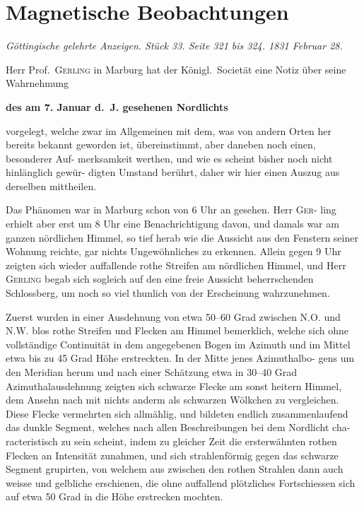 \documentclass[12pt,a4paper]{article}
\begin{document}
\newpage
\section*{Magnetische Beobachtungen}

\textit{Göttingische gelehrte Anzeigen. Stück 33. Seite 321 bis 324. 1831 Februar 28.}

Herr Prof.\ \textsc{Gerling} in Marburg hat der Königl.\ Societät eine Notiz über 
seine Wahrnehmung
\begin{center}
\textbf{des am 7. Januar d.\ J. gesehenen Nordlichts}
\end{center}
vorgelegt, welche zwar im Allgemeinen mit dem, was von andern Orten her bereits 
bekannt geworden ist, übereinstimmt, aber daneben noch einen, besonderer Auf-
merksamkeit werthen, und wie es scheint bisher noch nicht hinlänglich gewür-
digten Umstand berührt, daher wir hier einen Auszug aus derselben mittheilen.

Das Phänomen war in Marburg schon von 6 Uhr an gesehen. Herr \textsc{Ger}-
ling erhielt aber erst um 8 Uhr eine Benachrichtigung davon, und damals war 
am ganzen nördlichen Himmel, so tief herab wie die Aussicht aus den Fenstern 
seiner Wohnung reichte, gar nichts Ungewöhnliches zu erkennen. Allein gegen 
9 Uhr zeigten sich wieder auffallende rothe Streifen am nördlichen Himmel, und 
Herr \textsc{Gerling} begab sich sogleich auf den eine freie Aussicht beherrschenden 
Schlossberg, um noch so viel thunlich von der Erscheinung wahrzunehmen.

Zuerst wurden in einer Ausdehnung von etwa 50--60 Grad zwischen N.O. 
und N.W. blos rothe Streifen und Flecken am Himmel bemerklich, welche sich 
ohne vollständige Continuität in dem angegebenen Bogen im Azimuth und im 
Mittel etwa bis zu 45 Grad Höhe erstreckten. In der Mitte jenes Azimuthalbo-
gens um den Meridian herum und nach einer Schätzung etwa in 30--40 Grad 
Azimuthalausdehnung zeigten sich schwarze Flecke am sonst heitern Himmel, 
dem Ansehn nach mit nichts anderm als schwarzen Wölkchen zu vergleichen. 
Diese Flecke vermehrten sich allmählig, und bildeten endlich zusammenlaufend 
das dunkle Segment, welches nach allen Beschreibungen bei dem Nordlicht cha-
racteristisch zu sein scheint, indem zu gleicher Zeit die ersterwähnten rothen 
Flecken an Intensität zunahmen, und sich strahlenförmig gegen das schwarze 
Segment grupirten, von welchem aus zwischen den rothen Strahlen dann auch 
weisse und gelbliche erschienen, die ohne auffallend plötzliches Fortschiessen sich 
auf etwa 50 Grad in die Höhe erstrecken mochten.
\end{document}
